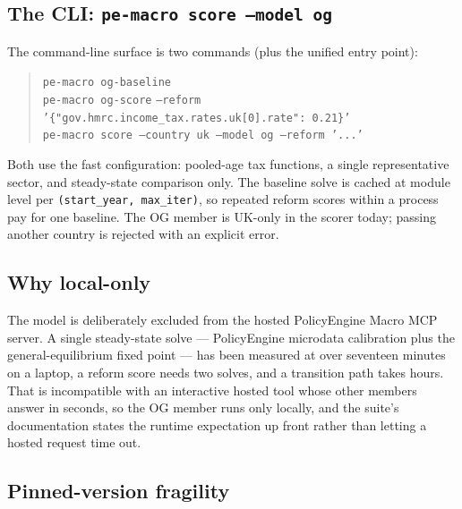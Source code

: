 \subsection{The CLI: \texttt{pe-macro score --model og}}
\label{subsec:cli}

The command-line surface is two commands (plus the unified entry point):
\begin{quote}
\texttt{pe-macro og-baseline}\\
\texttt{pe-macro og-score} \texttt{--reform}\\
\hspace*{1.5em}\texttt{'\{"gov.hmrc.income\_tax.rates.uk[0].rate": 0.21\}'}\\
\texttt{pe-macro score --country uk --model og --reform '...'}
\end{quote}
Both use the fast configuration: pooled-age tax functions, a single representative sector, and steady-state comparison only. The baseline solve is cached at module level per \texttt{(start\_year, max\_iter)}, so repeated reform scores within a process pay for one baseline. The OG member is UK-only in the scorer today; passing another country is rejected with an explicit error.

\subsection{Why local-only}
\label{subsec:localonly}

The model is deliberately excluded from the hosted PolicyEngine Macro MCP server. A single steady-state solve --- PolicyEngine microdata calibration plus the general-equilibrium fixed point --- has been measured at over seventeen minutes on a laptop, a reform score needs two solves, and a transition path takes hours. That is incompatible with an interactive hosted tool whose other members answer in seconds, so the OG member runs only locally, and the suite's documentation states the runtime expectation up front rather than letting a hosted request time out.

\subsection{Pinned-version fragility}
\label{subsec:pins}


